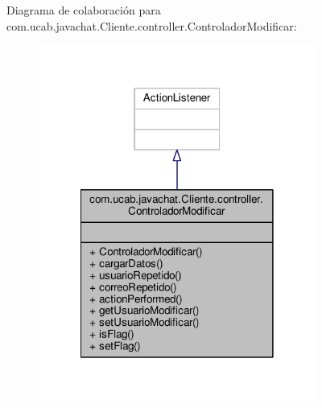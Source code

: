 Diagrama de colaboración para com.\-ucab.\-javachat.\-Cliente.\-controller.\-Controlador\-Modificar\-:\nopagebreak
\begin{figure}[H]
\begin{center}
\leavevmode
\includegraphics[width=258pt]{classcom_1_1ucab_1_1javachat_1_1_cliente_1_1controller_1_1_controlador_modificar__coll__graph}
\end{center}
\end{figure}

